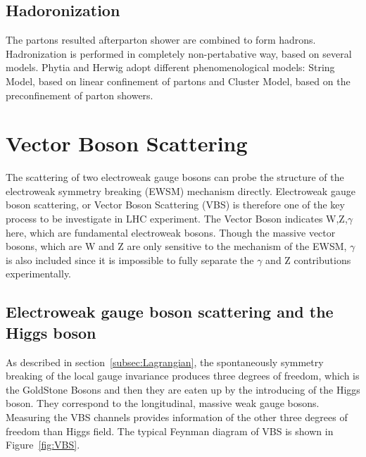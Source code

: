 \subsection{Hadoronization}
The partons resulted afterparton shower are combined to form hadrons. Hadronization is performed in completely non-pertabative way, based on several models. Phytia and Herwig adopt different phenomenological models: String Model, based on linear confinement of partons and Cluster Model, based on the preconfinement of parton showers.


\section{Vector Boson Scattering}
\label{sec:VBS}

The scattering of two electroweak gauge bosons can probe the structure of the electroweak symmetry breaking (EWSM) mechanism directly. 
Electroweak gauge boson scattering, or Vector Boson Scattering (VBS) is therefore one of the key process to be investigate in LHC experiment.
The Vector Boson indicates W,Z,$\gamma$ here, which are fundamental electroweak bosons. Though the massive vector bosons, which are W and Z are only sensitive to the mechanism of the  EWSM, $\gamma$ is also included since it is impossible to fully separate the $\gamma$ and Z contributions experimentally. 
\subsection{Electroweak gauge boson scattering and the Higgs boson}
As described in section~\ref{subsec:Lagrangian}, the spontaneously symmetry breaking of the local gauge invariance produces three degrees of freedom, which is the GoldStone Bosons and then they are eaten up by the introducing of the Higgs boson. They correspond to the longitudinal, massive weak gauge bosons. Measuring the VBS channels provides information of the other three degrees of freedom than Higgs field. The typical Feynman diagram of VBS is shown in Figure~\ref{fig:VBS}.

